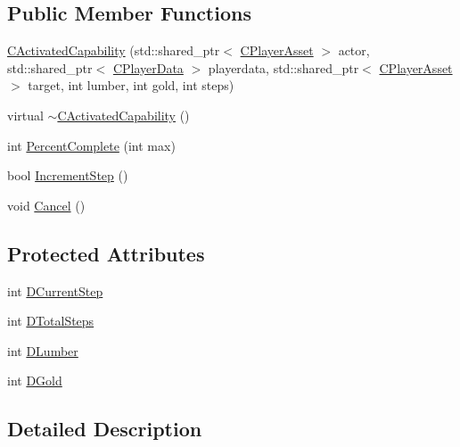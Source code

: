 \subsection*{Public Member Functions}
\begin{DoxyCompactItemize}
\item 
\hyperlink{classCPlayerCapabilityTrainNormal_1_1CActivatedCapability_a6d160dbc57c968390a91f0797cc53306}{C\+Activated\+Capability} (std\+::shared\+\_\+ptr$<$ \hyperlink{classCPlayerAsset}{C\+Player\+Asset} $>$ actor, std\+::shared\+\_\+ptr$<$ \hyperlink{classCPlayerData}{C\+Player\+Data} $>$ playerdata, std\+::shared\+\_\+ptr$<$ \hyperlink{classCPlayerAsset}{C\+Player\+Asset} $>$ target, int lumber, int gold, int steps)
\item 
virtual \hyperlink{classCPlayerCapabilityTrainNormal_1_1CActivatedCapability_ad0ce8533475cce5a85aca7b98bedb6b3}{$\sim$\+C\+Activated\+Capability} ()
\item 
int \hyperlink{classCPlayerCapabilityTrainNormal_1_1CActivatedCapability_ac0d2dd8e1b3aedb0873149ba4c92e6f7}{Percent\+Complete} (int max)
\item 
bool \hyperlink{classCPlayerCapabilityTrainNormal_1_1CActivatedCapability_a201f09e738af96fba1a871e4ed00f18a}{Increment\+Step} ()
\item 
void \hyperlink{classCPlayerCapabilityTrainNormal_1_1CActivatedCapability_a028dc1f8c528cc726737d712f0236884}{Cancel} ()
\end{DoxyCompactItemize}
\subsection*{Protected Attributes}
\begin{DoxyCompactItemize}
\item 
int \hyperlink{classCPlayerCapabilityTrainNormal_1_1CActivatedCapability_a2053317e0ee29f45f4ff5a28269cd635}{D\+Current\+Step}
\item 
int \hyperlink{classCPlayerCapabilityTrainNormal_1_1CActivatedCapability_a2bee6a6395fd7cc0fcf4001bbbadb165}{D\+Total\+Steps}
\item 
int \hyperlink{classCPlayerCapabilityTrainNormal_1_1CActivatedCapability_a49a77c92b6146819efb1a7a8b6fb8972}{D\+Lumber}
\item 
int \hyperlink{classCPlayerCapabilityTrainNormal_1_1CActivatedCapability_a1b994a572ca0fdfd64f6f71afb6b5988}{D\+Gold}
\end{DoxyCompactItemize}


\subsection{Detailed Description}


